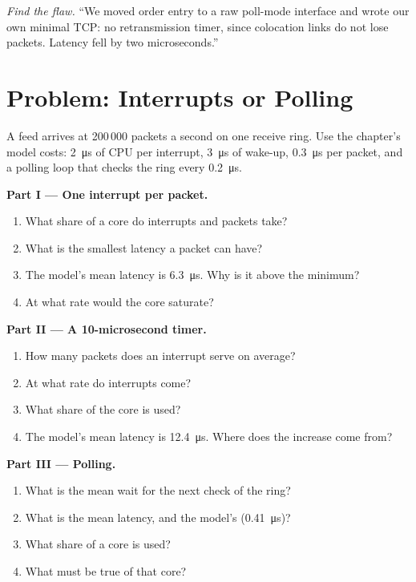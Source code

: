\begin{exercise}[$\star\star\star$]\label{exo:nw:network-cards-and-kernel-bypass:8}
\emph{Find the flaw.} ``We moved order entry to a raw poll-mode interface and wrote our own minimal TCP: no retransmission timer, since
colocation links do not lose packets. Latency fell by two microseconds.''
\end{exercise}

\section{Problem: Interrupts or Polling}

\begin{problem}\label{pb:nw:network-cards-and-kernel-bypass:1}
A feed arrives at 200\,000 packets a second on one receive ring. Use the chapter's model costs: \qty{2}{\micro\second} of CPU per
interrupt, \qty{3}{\micro\second} of wake-up, \qty{0.3}{\micro\second} per packet, and a polling loop that checks the ring every
\qty{0.2}{\micro\second}.

\medskip\noindent\textbf{Part I --- One interrupt per packet.}
\begin{enumerate}
\item What share of a core do interrupts and packets take?
\item What is the smallest latency a packet can have?
\item The model's mean latency is \qty{6.3}{\micro\second}. Why is it above the minimum?
\item At what rate would the core saturate?
\end{enumerate}

\medskip\noindent\textbf{Part II --- A 10-microsecond timer.}
\begin{enumerate}[resume]
\item How many packets does an interrupt serve on average?
\item At what rate do interrupts come?
\item What share of the core is used?
\item The model's mean latency is \qty{12.4}{\micro\second}. Where does the increase come from?
\end{enumerate}

\medskip\noindent\textbf{Part III --- Polling.}
\begin{enumerate}[resume]
\item What is the mean wait for the next check of the ring?
\item What is the mean latency, and the model's (\qty{0.41}{\micro\second})?
\item What share of a core is used?
\item What must be true of that core?
\end{enumerate}


\end{problem}
